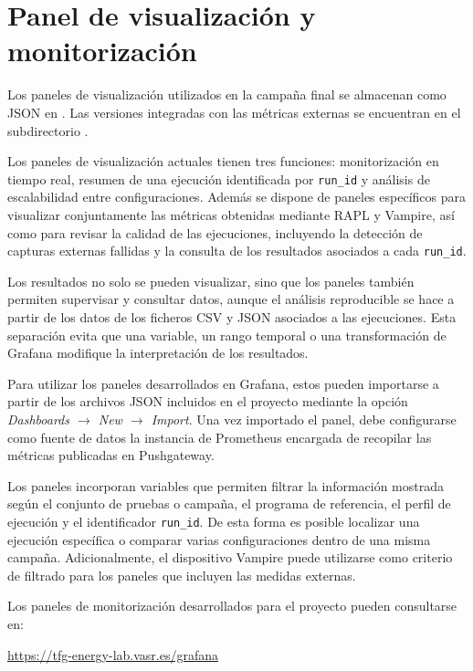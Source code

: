 \chapter{Panel de visualización y monitorización}
\label{anexo:dashboards}

Los paneles de visualización utilizados en la campaña final se almacenan como JSON en . Las versiones integradas con las métricas externas se encuentran en el subdirectorio .

Los paneles de visualización actuales tienen tres funciones: monitorización en tiempo real, resumen de una ejecución identificada por \texttt{run\_id} y análisis de escalabilidad entre configuraciones. Además se dispone de paneles específicos para visualizar conjuntamente las métricas obtenidas mediante RAPL y Vampire, así como para revisar la calidad de las ejecuciones, incluyendo la detección de capturas externas fallidas y la consulta de los resultados asociados a cada \texttt{run\_id}.

Los resultados no solo se pueden visualizar, sino que los paneles también permiten supervisar y consultar datos, aunque el análisis reproducible se hace a partir de los datos de los ficheros CSV y JSON asociados a las ejecuciones. Esta separación evita que una variable, un rango temporal o una transformación de Grafana modifique la interpretación de los resultados.

Para utilizar los paneles desarrollados en Grafana, estos pueden importarse a partir de los archivos JSON incluidos en el proyecto mediante la opción \emph{Dashboards $\rightarrow$ New $\rightarrow$ Import}. Una vez importado el panel, debe configurarse como fuente de datos la instancia de Prometheus encargada de recopilar las métricas publicadas en Pushgateway.

Los paneles incorporan variables que permiten filtrar la información mostrada según el conjunto de pruebas o campaña, el programa de referencia, el perfil de ejecución y el identificador \texttt{run\_id}. De esta forma es posible localizar una ejecución específica o comparar varias configuraciones dentro de una misma campaña. Adicionalmente, el dispositivo Vampire puede utilizarse como criterio de filtrado para los paneles que incluyen las medidas externas.


Los paneles de monitorización desarrollados para el proyecto pueden consultarse en:

\begin{center}
   \url{https://tfg-energy-lab.vasr.es/grafana}
\end{center}

